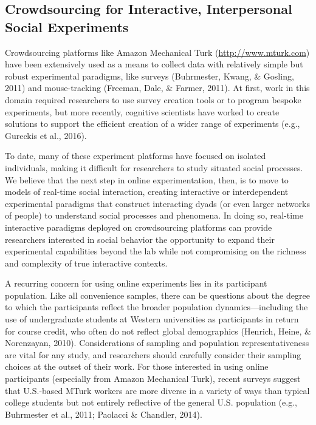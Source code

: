 \documentclass[10pt, letterpaper]{article}
\begin{document}
\subsection{Crowdsourcing for Interactive, Interpersonal Social
Experiments}\label{crowdsourcing-for-interactive-interpersonal-social-experiments}

Crowdsourcing platforms like Amazon Mechanical Turk
(\url{http://www.mturk.com}) have been extensively used as a means to
collect data with relatively simple but robust experimental paradigms,
like surveys (Buhrmester, Kwang, \& Gosling, 2011) and mouse-tracking
(Freeman, Dale, \& Farmer, 2011). At first, work in this domain required
researchers to use survey creation tools or to program bespoke
experiments, but more recently, cognitive scientists have worked to
create solutions to support the efficient creation of a wider range of
experiments (e.g., Gureckis et al., 2016).

To date, many of these experiment platforms have focused on isolated
individuals, making it difficult for researchers to study situated
social processes. We believe that the next step in online
experimentation, then, is to move to models of real-time social
interaction, creating interactive or interdependent experimental
paradigms that construct interacting dyads (or even larger networks of
people) to understand social processes and phenomena. In doing so,
real-time interactive paradigms deployed on crowdsourcing platforms can
provide researchers interested in social behavior the opportunity to
expand their experimental capabilities beyond the lab while not
compromising on the richness and complexity of true interactive
contexts.

A recurring concern for using online experiments lies in its participant
population. Like all convenience samples, there can be questions about
the degree to which the participants reflect the broader population
dynamics---including the use of undergraduate students at Western
universities as participants in return for course credit, who often do
not reflect global demographics (Henrich, Heine, \& Norenzayan, 2010).
Considerations of sampling and population representativeness are vital
for any study, and researchers should carefully consider their sampling
choices at the outset of their work. For those interested in using
online participants (especially from Amazon Mechanical Turk), recent
surveys suggest that U.S.-based MTurk workers are more diverse in a
variety of ways than typical college students but not entirely
reflective of the general U.S. population (e.g., Buhrmester et al.,
2011; Paolacci \& Chandler, 2014).
\end{document}
